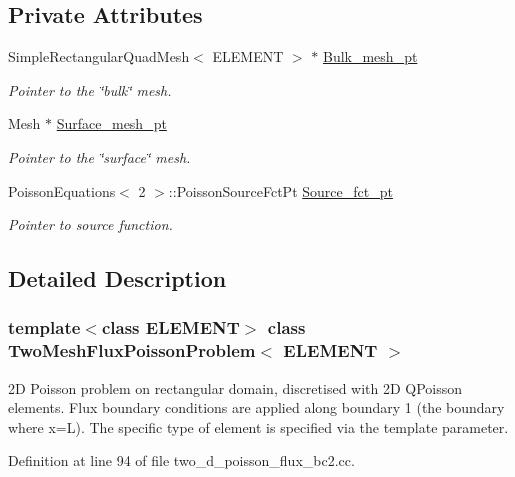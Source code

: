 \subsection*{Private Attributes}
\begin{DoxyCompactItemize}
\item 
Simple\+Rectangular\+Quad\+Mesh$<$ E\+L\+E\+M\+E\+NT $>$ $\ast$ \hyperlink{classTwoMeshFluxPoissonProblem_abd0718261b6c8586d5de35cfef2292d8}{Bulk\+\_\+mesh\+\_\+pt}
\begin{DoxyCompactList}\small\item\em Pointer to the \char`\"{}bulk\char`\"{} mesh. \end{DoxyCompactList}\item 
Mesh $\ast$ \hyperlink{classTwoMeshFluxPoissonProblem_a96b1ff6102eceb5ce432ac9197f68283}{Surface\+\_\+mesh\+\_\+pt}
\begin{DoxyCompactList}\small\item\em Pointer to the \char`\"{}surface\char`\"{} mesh. \end{DoxyCompactList}\item 
Poisson\+Equations$<$ 2 $>$\+::Poisson\+Source\+Fct\+Pt \hyperlink{classTwoMeshFluxPoissonProblem_a56a27b0dbf0f5975a4b9d37f3985c364}{Source\+\_\+fct\+\_\+pt}
\begin{DoxyCompactList}\small\item\em Pointer to source function. \end{DoxyCompactList}\end{DoxyCompactItemize}


\subsection{Detailed Description}
\subsubsection*{template$<$class E\+L\+E\+M\+E\+NT$>$\newline
class Two\+Mesh\+Flux\+Poisson\+Problem$<$ E\+L\+E\+M\+E\+N\+T $>$}

2D Poisson problem on rectangular domain, discretised with 2D Q\+Poisson elements. Flux boundary conditions are applied along boundary 1 (the boundary where x=L). The specific type of element is specified via the template parameter. 

Definition at line 94 of file two\+\_\+d\+\_\+poisson\+\_\+flux\+\_\+bc2.\+cc.



